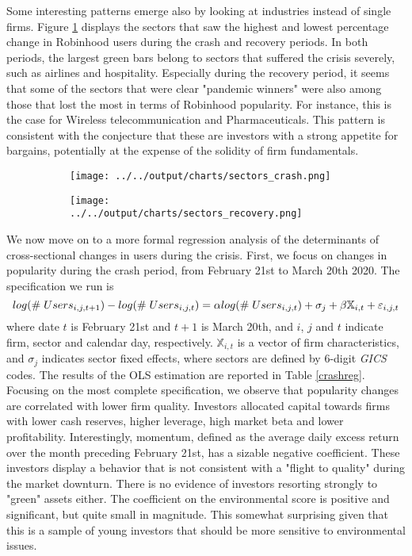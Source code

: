 \documentclass[12pt]{article}
\numberwithin{equation}{section} %
\begin{document}
Some interesting patterns emerge also by looking at industries instead of single firms. Figure \ref{chart-sectors} displays the sectors that saw the highest and lowest percentage change in Robinhood users during the crash and recovery periods. In both periods, the largest green bars belong to sectors that suffered the crisis severely, such as airlines and hospitality. Especially during the recovery period, it seems that some of the sectors that were clear "pandemic winners" were also among those that lost the most in terms of Robinhood popularity. For instance, this is the case for Wireless telecommunication and Pharmaceuticals. This pattern is consistent with the conjecture that these are investors with a strong appetite for bargains, potentially at the expense of the solidity of firm fundamentals.

\begin{figure}
\centering
\caption{Test}
\begin{subfigure}{.8\textwidth}
\centering
\texttt{[image: ../../output/charts/sectors\_crash.png]} 
\end{subfigure} 
\begin{subfigure}{.8\textwidth}
\centering
\texttt{[image: ../../output/charts/sectors\_recovery.png]}
\end{subfigure}
\label{chart-sectors}
\end{figure}

We now move on to a more formal regression analysis of the determinants of cross-sectional changes in users during the crisis. First, we focus on changes in popularity during the crash period, from February 21st to March 20th 2020.
The specification we run is 
$$
log(\# \hspace{1mm} Users_{i,j,t+1})-log(\# \hspace{1mm} Users_{i,j,t}) = \alpha log(\# \hspace{1mm} Users_{i,j,t}) + \sigma_j + \beta \mathbb{X}_{i,t} + \varepsilon_{i,j,t}
$$
where date $t$ is February 21st and $t+1$ is March 20th, and $i$, $j$ and $t$ indicate firm, sector and calendar day, respectively. $\mathbb{X}_{i,t}$ is a vector of firm characteristics, and  $\sigma_j$ indicates sector fixed effects, where sectors are defined by 6-digit \textit{GICS} codes.  The results of the OLS estimation are reported in Table \ref{crashreg}. Focusing on the most complete specification, we observe that popularity changes are correlated with lower firm quality. Investors allocated capital towards firms with lower cash reserves, higher leverage, high market beta and lower profitability. Interestingly, momentum, defined as the average daily excess return over the month preceding February 21st, has a sizable negative coefficient. These investors display a behavior that is not consistent with a "flight to quality" during the market downturn. There is no evidence of investors resorting strongly to "green" assets either. The coefficient on the environmental score is positive and significant, but quite small in magnitude. This somewhat surprising given that this is a sample of young investors that should be more sensitive to environmental issues.
\end{document}

